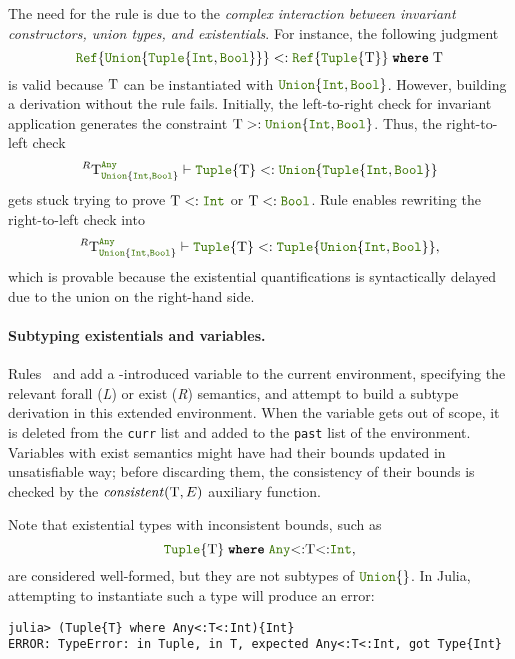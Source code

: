 The need for the
 rule is
due to the \emph{complex interaction between invariant constructors, union
types, and existentials}.  For instance, the following judgment
\[
  \reftyp{\uniontyp{\tupletyp{\inttyp, \jlname{Bool}}}} <:
  \wheret{\reftyp{\tupletyp{\T}}}{\T}
\]
is valid because \(\mathrm{T}\) can be instantiated with
$\uniontyp{\inttyp, \jlname{Bool}}$.  However, building a derivation without the
 rule fails.  Initially, the
left-to-right check for invariant application generates the constraint
\(\T >: \uniontyp{\inttyp, \jlname{Bool}}\).  Thus, the right-to-left check
\[ ^R \T_{\uniontyp{\inttyp, \jlname{Bool}}}^{\anytyp} \vdash
  \tupletyp{\T} <: \uniontyp{\tupletyp{\inttyp, \jlname{Bool}}} \]
gets stuck trying to prove \(\T<:\inttyp\) or \(\T<:\jlname{Bool}\).  Rule
 enables rewriting the
right-to-left check into 
\[ ^R \T_{\uniontyp{\inttyp, \jlname{Bool}}}^{\anytyp} \vdash
  \tupletyp{\T} <: \tupletyp{\uniontyp{\inttyp, \jlname{Bool}}}, \]
which is provable because the existential quantifications is syntactically
delayed  due to the union on the right-hand side.

\paragraph{Subtyping existentials and variables.}
Rules~ and  add a
\wheret{}{}-introduced variable to the current environment, 
specifying the relevant forall (\textit{L}) or exist (\textit{R})
semantics, and attempt to build a subtype derivation in this extended
environment.  When the variable gets out of scope, it
is deleted from the \texttt{curr} list and added to the
\texttt{past} list of the environment. 
Variables with exist semantics might have had
their bounds updated in unsatisfiable way; before discarding them, the
consistency of their bounds is checked by the \(\mathit{consistent}(\mathrm{T},E)\)
auxiliary function.

Note that existential types with inconsistent bounds, such as
\[
  \wheret{\tupletyp{\T}}{\anytyp{<:}\T{<:}\inttyp},
\]
are considered well-formed, but they are not subtypes of $\uniontyp{}$.
In Julia, attempting to instantiate such a type will produce an error:
\begin{lstlisting}
julia> (Tuple{T} where Any<:T<:Int){Int}
ERROR: TypeError: in Tuple, in T, expected Any<:T<:Int, got Type{Int}  
\end{lstlisting}

